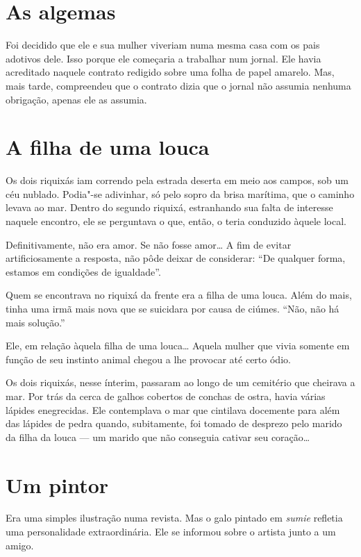 \section{As algemas}

Foi decidido que ele e sua mulher viveriam numa mesma casa com os pais
adotivos dele. Isso porque ele começaria a trabalhar num jornal. Ele
havia acreditado naquele contrato redigido sobre uma folha de papel
amarelo. Mas, mais tarde, compreendeu que o contrato dizia que o jornal
não assumia nenhuma obrigação, apenas ele as assumia.

\section{A filha de uma louca}

Os dois riquixás iam correndo pela estrada deserta em meio aos campos,
sob um céu nublado. Podia"-se adivinhar, só pelo sopro da brisa
marítima, que o caminho levava ao mar. Dentro do segundo riquixá,
estranhando sua falta de interesse naquele encontro, ele se perguntava
o que, então, o teria conduzido àquele local.

Definitivamente, não era amor. Se não fosse amor\ldots{} A fim de evitar
artificiosamente a resposta, não pôde deixar de considerar: ``De
qualquer forma, estamos em condições de igualdade''.

Quem se encontrava no riquixá da frente era a filha de uma louca. Além
do mais, tinha uma irmã mais nova que se suicidara por causa de ciúmes.
``Não, não há mais solução.''

Ele, em relação àquela filha de uma louca\ldots{} Aquela mulher que vivia
somente em função de seu instinto animal chegou a lhe provocar até
certo ódio.

Os dois riquixás, nesse ínterim, passaram ao longo de um cemitério que
cheirava a mar. Por trás da cerca de galhos cobertos de conchas de
ostra, havia várias lápides enegrecidas. Ele contemplava o mar que
cintilava docemente para além das lápides de pedra quando, subitamente,
foi tomado de desprezo pelo marido da filha da louca --- um marido que
não conseguia cativar seu coração\ldots{}

\section{Um pintor}

Era uma simples ilustração numa revista. Mas o galo pintado em
\textit{sumie} refletia uma personalidade extraordinária. Ele se
informou sobre o artista junto a um amigo.

